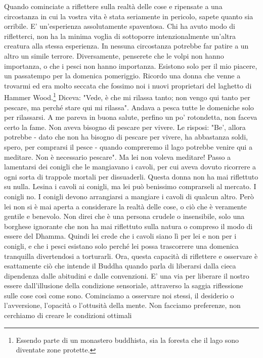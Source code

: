 Quando cominciate a riflettere sulla realtà delle cose e ripensate a una
circostanza in cui la vostra vita è stata seriamente in pericolo, sapete
quanto sia orribile. E' un'esperienza assolutamente spaventosa. Chi ha
avuto modo di rifletterci, non ha la minima voglia di sottoporre
intenzionalmente un'altra creatura alla stessa esperienza. In nessuna
circostanza potrebbe far patire a un altro un simile terrore.
Diversamente, penserete che le volpi non hanno importanza, o che i pesci
non hanno importanza. Esistono solo per il mio piacere, un passatempo
per la domenica pomeriggio. Ricordo una donna che venne a trovarmi ed
era molto seccata che fossimo noi i nuovi proprietari del laghetto di
Hammer Wood.\footnote{Essendo parte di un monastero buddhista, sia la foresta
che il lago sono diventate zone protette.} Diceva: "Vede, è che mi rilassa tanto; non
vengo qui tanto per pescare, ma perché stare qui mi rilassa". Andava a
pesca tutte le domeniche solo per rilassarsi. A me pareva in buona
salute, perfino un po' rotondetta, non faceva certo la fame. Non aveva
bisogno di pescare per vivere. Le risposi: "Be', allora potrebbe - dato
che non ha bisogno di pescare per vivere, ha abbastanza soldi, spero,
per comprarsi il pesce - quando compreremo il lago potrebbe venire qui a
meditare. Non è necessario pescare". Ma lei non voleva meditare! Passo a
lamentarsi dei conigli che le mangiavano i cavoli, per cui aveva dovuto
ricorrere a ogni sorta di trappole mortali per dissuaderli. Questa donna
non ha mai riflettuto su nulla. Lesina i cavoli ai conigli, ma lei può
benissimo comprarseli al mercato. I conigli no. I conigli devono
arrangiarsi a mangiare i cavoli di qualcun altro. Però lei non si è mai
aperta a considerare la realtà delle cose, o ciò che è veramente gentile
e benevolo. Non direi che è una persona crudele o insensibile, solo una
borghese ignorante che non ha mai riflettuto sulla natura o compreso il
modo di essere del Dhamma. Quindi lei crede che i cavoli siano lì per
lei e non per i conigli, e che i pesci esistano solo perché lei possa
trascorrere una domenica tranquilla divertendosi a torturarli.
Ora, questa capacità di riflettere e osservare è esattamente ciò che
intende il Buddha quando parla di liberarsi dalla cieca dipendenza dalle
abitudini e dalle convenzioni. E' una via per liberare il nostro essere
dall'illusione della condizione sensoriale, attraverso la saggia
riflessione sulle cose così come sono. Cominciamo a osservare noi
stessi, il desiderio o l'avversione, l'opacità o l'ottusità della mente.
Non facciamo preferenze, non cerchiamo di creare le condizioni ottimali
